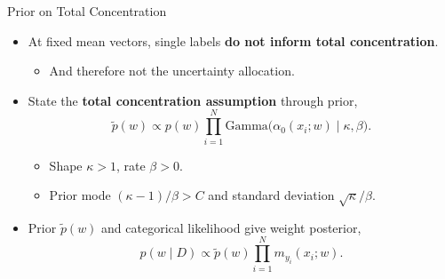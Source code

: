 \begin{frame}{Prior on Total Concentration}\label{frm:gamma-prior}
\begin{itemize}
\setlength{\itemsep}{3mm}
\item At fixed mean vectors, single labels \textbf{do not inform total concentration}.
\begin{itemize}
\item And therefore not the uncertainty allocation.
\end{itemize}
\item<2-> State the \textbf{total concentration assumption} through prior,
\[
\tilde p(w)\propto p(w)\prod_{i=1}^{N}
\mathrm{Gamma}\bigl(\alpha_0(x_i;w)\mid\kappa,\beta\bigr).
\]
\begin{itemize}
\item Shape $\kappa>1$, rate $\beta>0$.
\item Prior mode $(\kappa-1)/\beta>C$ and standard deviation $\sqrt{\kappa}/\beta$. %
\end{itemize}
\item<3-> Prior $\tilde p(w)$ and categorical likelihood give weight posterior,
\[
p(w\mid D)\propto\tilde p(w)\prod_{i=1}^{N}m_{y_i}(x_i;w).
\]
\end{itemize}
\end{frame}

